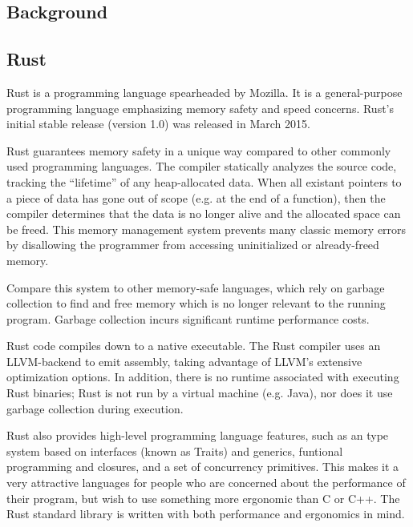 \documentclass{article}
\begin{document}
\begin{multicols}{2}
\section{Background}

\subsection{Rust}

Rust is a programming language spearheaded by Mozilla. It is a
general-purpose programming language emphasizing memory safety and speed
concerns. Rust's initial stable release (version 1.0) was released in March
2015. \newline

Rust guarantees memory safety in a unique way compared to other commonly used
programming languages. The compiler statically analyzes the source code,
tracking the ``lifetime'' of any heap-allocated data. When all existant pointers
to a piece of data has gone out of scope (e.g. at the end of a function), then
the compiler determines that the data is no longer alive and the allocated space
can be freed.
This memory management system prevents many classic memory errors by disallowing
the programmer from accessing uninitialized or already-freed memory. \newline

Compare this system to other memory-safe languages, which rely on garbage
collection to find and free memory which is no longer relevant to the running
program. Garbage collection incurs significant runtime performance costs.
\newline

Rust code compiles down to a native executable. The Rust compiler uses an
LLVM-backend to emit assembly, taking advantage of LLVM's extensive optimization
options. In addition, there is no runtime associated with executing Rust
binaries; Rust is not run by a virtual machine (e.g. Java), nor does it use
garbage collection during execution. \newline

Rust also provides high-level programming language features, such as an type
system based on interfaces (known as Traits) and generics, funtional programming
and closures, and a set of concurrency primitives. This makes it a very
attractive languages for people who are concerned about the performance of their
program, but wish to use something more ergonomic than C or C++. The Rust
standard library is written with both performance and ergonomics in mind.


\end{multicols}
\end{document}
